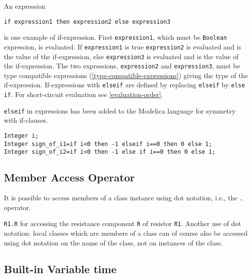 An expression
\begin{lstlisting}[language=modelica]
if expression1 then expression2 else expression3
\end{lstlisting}
is one example of if-expression. First \lstinline!expression1!, which must be
\lstinline!Boolean! expression, is evaluated. If \lstinline!expression1! is true \lstinline!expression2! is
evaluated and is the value of the if-expression, else \lstinline!expression3! is
evaluated and is the value of the if-expression. The two expressions,
\lstinline!expression2! and \lstinline!expression3!, must be type compatible expressions
(\autoref{type-compatible-expressions}) giving the type of the if-expression. If-expressions with
\lstinline!elseif! are defined by replacing \lstinline!elseif! by \lstinline!else if!. For
short-circuit evaluation see \autoref{evaluation-order}.

\begin{nonnormative}
\lstinline!elseif! in expressions has been added to the Modelica language for symmetry with if-clauses.
\end{nonnormative}

\begin{example}
\begin{lstlisting}[language=modelica]
Integer i;
Integer sign_of_i1=if i<0 then -1 elseif i==0 then 0 else 1;
Integer sign_of_i2=if i<0 then -1 else if i==0 then 0 else 1;
\end{lstlisting}
\end{example}

\subsection{Member Access Operator}

It is possible to access members of a class instance using dot notation,
i.e., the \lstinline!.! operator.

\begin{example}
\lstinline!R1.R! for accessing the resistance component \lstinline!R!
of resistor \lstinline!R1!. Another use of dot notation: local classes
which are members of a class can of course also be accessed using dot
notation on the name of the class, not on instances of the class.
\end{example}

\subsection{Built-in Variable time}

